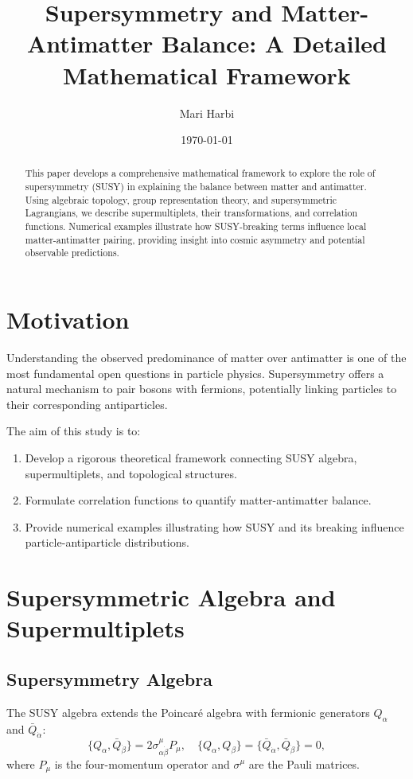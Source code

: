 \documentclass[12pt,a4paper]{article}
\title{Supersymmetry and Matter-Antimatter Balance: A Detailed Mathematical Framework}
\author{Mari Harbi}
\date{\today}
\begin{document}
\maketitle

\begin{abstract}
This paper develops a comprehensive mathematical framework to explore the role of supersymmetry (SUSY) in explaining the balance between matter and antimatter. Using algebraic topology, group representation theory, and supersymmetric Lagrangians, we describe supermultiplets, their transformations, and correlation functions. Numerical examples illustrate how SUSY-breaking terms influence local matter-antimatter pairing, providing insight into cosmic asymmetry and potential observable predictions.
\end{abstract}

\section{Motivation}
Understanding the observed predominance of matter over antimatter is one of the most fundamental open questions in particle physics. Supersymmetry offers a natural mechanism to pair bosons with fermions, potentially linking particles to their corresponding antiparticles.  

The aim of this study is to:  
\begin{enumerate}
    \item Develop a rigorous theoretical framework connecting SUSY algebra, supermultiplets, and topological structures.  
    \item Formulate correlation functions to quantify matter-antimatter balance.  
    \item Provide numerical examples illustrating how SUSY and its breaking influence particle-antiparticle distributions.  
\end{enumerate}

\section{Supersymmetric Algebra and Supermultiplets}
\subsection{Supersymmetry Algebra}
The SUSY algebra extends the Poincaré algebra with fermionic generators \(Q_\alpha\) and \(\bar Q_{\dot\alpha}\):
\begin{equation}
\{Q_\alpha, \bar Q_{\dot\beta}\} = 2\sigma^\mu_{\alpha\dot\beta} P_\mu, \quad
\{Q_\alpha, Q_\beta\} = \{\bar Q_{\dot\alpha}, \bar Q_{\dot\beta}\} = 0,
\end{equation}
where \(P_\mu\) is the four-momentum operator and \(\sigma^\mu\) are the Pauli matrices.
\end{document}
